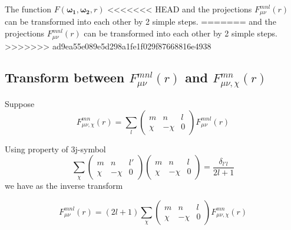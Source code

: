 The function $F(\boldsymbol{\omega_{1}},\boldsymbol{\omega_{2}},r)$
<<<<<<< HEAD
and the projections $F_{\mu\nu}^{mnl}(r)$ can be transformed into
each other by 2 simple steps.
=======
and the projections $F_{\mu\nu}^{mnl}(r)$ can be transformed into each
other by 2 simple steps.
>>>>>>> ad9ea55e089e5d298a1fe1f029f87668816e4938


\subsection{Transform between $F_{\mu\nu}^{mnl}(r)$ and $F_{\mu\nu,\chi}^{mn}(r)$ }

Suppose
\begin{equation}
F_{\mu\nu,\chi}^{mn}(r)=\sum_{l}\left(\begin{array}{ccc}
m & n & l\\
\chi & -\chi & 0
\end{array}\right)F_{\mu\nu}^{mnl}(r)
\end{equation}


Using property of 3j-symbol \citep{Messiah}
\begin{equation}
\sum_{\chi}\left(\begin{array}{ccc}
m & n & l'\\
\chi & -\chi & 0
\end{array}\right)\left(\begin{array}{ccc}
m & n & l\\
\chi & -\chi & 0
\end{array}\right)=\frac{\delta_{l'l}}{2l+1}
\end{equation}
we have as the inverse transform

\begin{equation}
F_{\mu\nu}^{mnl}(r)=\left(2l+1\right)\sum_{\chi}\left(\begin{array}{ccc}
m & n & l\\
\chi & -\chi & 0
\end{array}\right)F_{\mu\nu,\chi}^{mn}(r)
\end{equation}


